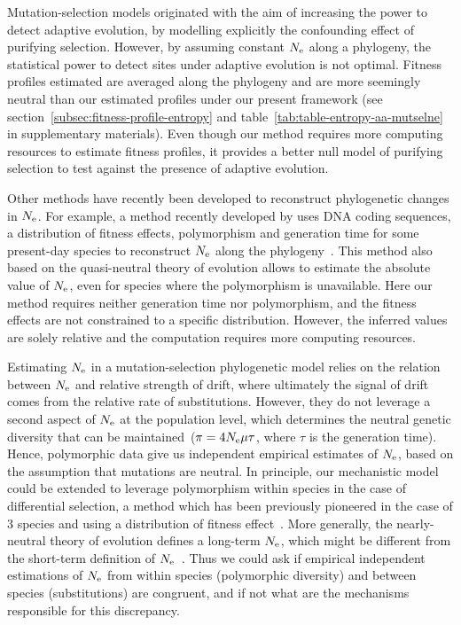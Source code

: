 Mutation-selection models originated with the aim of increasing the power to detect adaptive evolution, by modelling explicitly the confounding effect of purifying selection.
However, by assuming constant $N_{\mathrm{e}}$ along a phylogeny, the statistical power to detect sites under adaptive evolution is not optimal.
Fitness profiles estimated are averaged along the phylogeny and are more seemingly neutral than our estimated profiles under our present framework (see section~\ref{subsec:fitness-profile-entropy} and table~\ref{tab:table-entropy-aa-mutselne} in supplementary materials).
Even though our method requires more computing resources to estimate fitness profiles, it provides a better null model of purifying selection to test against the presence of adaptive evolution.

Other methods have recently been developed to reconstruct phylogenetic changes in $N_{\mathrm{e}}$.
For example, a method recently developed by \citet{Brevet2019} uses \acrshort{DNA} coding sequences, a distribution of fitness effects, polymorphism and generation time for some present-day species to reconstruct $N_{\mathrm{e}}$ along the phylogeny~\citep{Brevet2019}.
This method also based on the quasi-neutral theory of evolution allows to estimate the absolute value of $N_{\mathrm{e}}$, even for species where the polymorphism is unavailable.
Here our method requires neither generation time nor polymorphism, and the fitness effects are not constrained to a specific distribution.
However, the inferred values are solely relative and the computation requires more computing resources.

Estimating $N_{\mathrm{e}}$ in a mutation-selection phylogenetic model relies on the relation between $N_{\mathrm{e}}$ and relative strength of drift, where ultimately the signal of drift comes from the relative rate of substitutions.
However, they do not leverage a second aspect of $N_{\mathrm{e}}$ at the population level, which determines the neutral genetic diversity that can be maintained~($\pi=4N_{\mathrm{e}} \mu \tau$, where $\tau$ is the generation time).
Hence, polymorphic data give us independent empirical estimates of $N_{\mathrm{e}}$, based on the assumption that mutations are neutral.
In principle, our mechanistic model could be extended to leverage polymorphism within species in the case of differential selection, a method which has been previously pioneered in the case of $3$ species and using a distribution of fitness effect~\citep{Wilson2011}.
More generally, the nearly-neutral theory of evolution defines a long-term $N_{\mathrm{e}}$, which might be different from the short-term definition of $N_{\mathrm{e}}$~\citep{Platt2018}.
Thus we could ask if empirical independent estimations of $N_{\mathrm{e}}$ from within species (polymorphic diversity) and between species (substitutions) are congruent, and if not what are the mechanisms responsible for this discrepancy.

